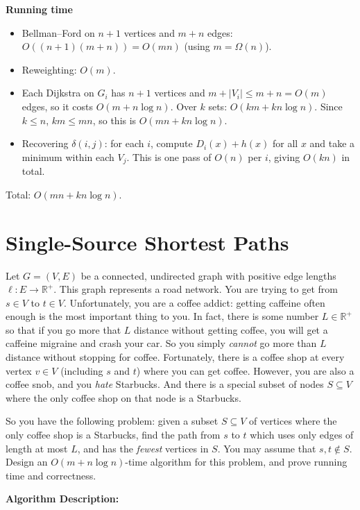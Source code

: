 \documentclass[11pt]{article}
\begin{document}
\medskip

\textbf{Running time}
\begin{itemize}
  \item Bellman--Ford on $n+1$ vertices and $m+n$ edges: $O((n+1)(m+n))=O(mn)$ (using $m=\Omega(n)$).
  \item Reweighting: $O(m)$.
  \item Each Dijkstra on $G_i$ has $n+1$ vertices and $m+|V_i|\le m+n=O(m)$ edges, so it costs $O(m+n\log n)$. Over $k$ sets: $O(km+kn\log n)$. Since $k\le n$, $km\le mn$, so this is $O(mn+kn\log n)$.
  \item Recovering $\delta(i,j)$: for each $i$, compute $D_i(x)+h(x)$ for all $x$ and take a minimum within each $V_j$. This is one pass of $O(n)$ per $i$, giving $O(kn)$ in total.
\end{itemize}
Total: $O(mn+kn\log n)$. 


\section{Single-Source Shortest Paths}
Let $G = (V, E)$ be a connected, undirected graph with positive edge lengths $\ell : E \rightarrow \mathbb{R}^+$. This graph represents a road network. 
You are trying to get from $s \in V$ to $t \in V$. Unfortunately, you are a coffee addict: getting caffeine often enough is the most important thing to you. 
In fact, there is some number $L \in \mathbb{R}^+$ so that if you go more that $L$ distance without getting coffee, 
you will get a caffeine migraine and crash your car.  So you simply \emph{cannot} go more than $L$ distance without stopping for coffee. 
Fortunately, there is a coffee shop at every vertex $v \in V$ (including $s$ and $t$) where you can get coffee. 
However, you are also a coffee snob, and you \emph{hate} Starbucks. And there is a special subset of nodes $S \subseteq V$ 
where the only coffee shop on that node is a Starbucks.

So you have the following problem: given a subset $S \subseteq V$ of vertices where the only coffee shop is a Starbucks, 
find the path from $s$ to $t$ which uses only edges of length at most $L$, and has the \emph{fewest} vertices in $S$.  
You may assume that $s,t\not\in S$.  Design an $O(m + n\log n)$-time algorithm for this problem, and prove running time and correctness.

\bigskip

\textbf{Algorithm Description:}
\end{document}
